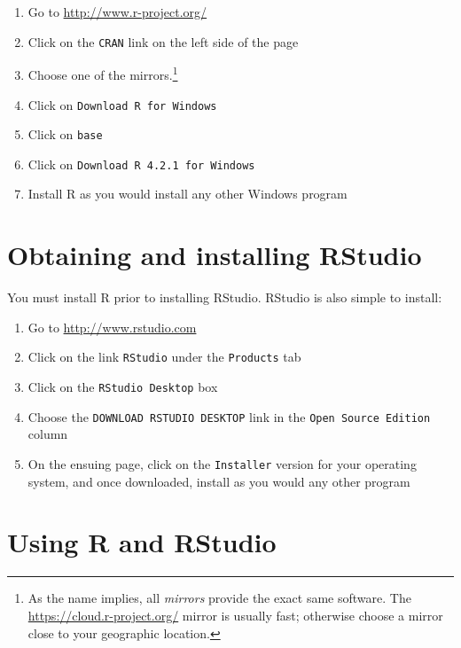 \documentclass[
]{krantz}
\providecommand{\tightlist}{%
  \setlength{\itemsep}{0pt}\setlength{\parskip}{0pt}}
\begin{document}
\begin{enumerate}
\def\labelenumi{\arabic{enumi}.}
\tightlist
\item
  Go to \url{http://www.r-project.org/}
\item
  Click on the \texttt{CRAN} link on the left side of the page
\item
  Choose one of the mirrors.\footnote{As the name implies, all \emph{mirrors} provide the exact same software. The \url{https://cloud.r-project.org/} mirror is usually fast; otherwise choose a mirror close to your geographic location.}
\item
  Click on \texttt{Download\ R\ for\ Windows}
\item
  Click on \texttt{base}
\item
  Click on \texttt{Download\ R\ 4.2.1\ for\ Windows}
\item
  Install R as you would install any other Windows program
\end{enumerate}

\hypertarget{obtaining-and-installing-rstudio}{%
\section{Obtaining and installing RStudio}\label{obtaining-and-installing-rstudio}}

You must install R prior to installing RStudio. RStudio is also simple to install:

\begin{enumerate}
\def\labelenumi{\arabic{enumi}.}
\tightlist
\item
  Go to \url{http://www.rstudio.com}
\item
  Click on the link \texttt{RStudio} under the \texttt{Products} tab
\item
  Click on the \texttt{RStudio\ Desktop} box
\item
  Choose the \texttt{DOWNLOAD\ RSTUDIO\ DESKTOP} link in the \texttt{Open\ Source\ Edition} column
\item
  On the ensuing page, click on the \texttt{Installer} version for your operating system, and once downloaded, install as you would any other program
\end{enumerate}

\hypertarget{using-r-and-rstudio}{%
\section{Using R and RStudio}\label{using-r-and-rstudio}}
\end{document}
